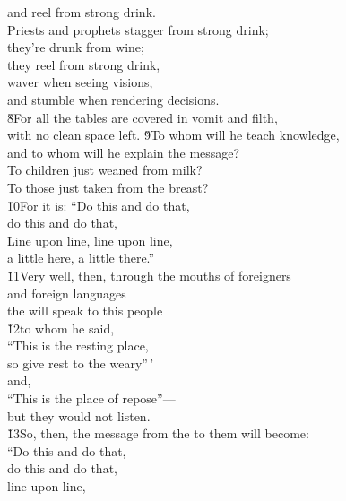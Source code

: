 \begin{poetry}
\poemll    and reel from strong drink. \\
\poeml Priests and prophets stagger from strong drink; \\
\poemll    they're drunk from wine; \\
\poeml they reel from strong drink, \\
\poemll    waver when seeing visions, \\
\poemlll       and stumble when rendering decisions. \\
\poeml \v{8}For all the tables are covered in vomit and filth, \\
\poemll    with no clean space left.
\poeml \v{9}To whom will he teach knowledge, \\
\poemll    and to whom will he explain the message? \\
\poeml To children just weaned from milk? \\
\poemll    To those just taken from the breast? \\
\poeml \v{10}For it is: ``Do this and do that, \\
\poemll    do this and do that, \\
\poeml Line upon line, line upon line, \\
\poemll    a little here, a little there.'' \\
\poeml \v{11}Very well, then, through the mouths of foreigners \\
\poemll    and foreign languages \\
\poemlll       the  will speak to this people \\
\poeml \v{12}to whom he said, \\
\poemll    ``This is the resting place, \\
\poemlll       so give rest to the weary''\,' \\
\poeml and, \\
\poemll    ``This is the place of repose''--- \\
\poemlll       but they would not listen. \\
\poeml \v{13}So, then, the message from the  to them will become: \\
\poemll    ``Do this and do that, \\
\poemlll       do this and do that, \\
\poemll    line upon line, \\

\end{poetry}
